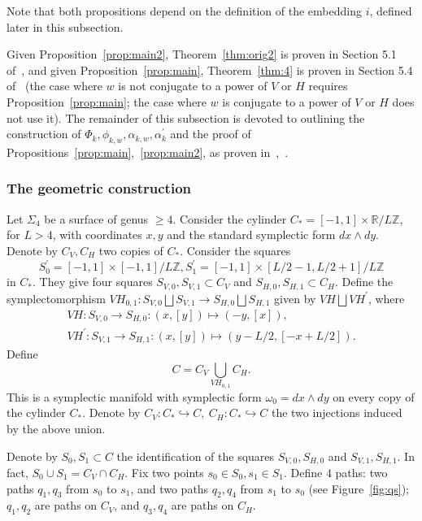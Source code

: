\documentclass[11pt]{article}
\newenvironment{myequation}
    {
        \begin{equation*}
        \begin{gathered}
    }
    { 
        \end{gathered} 
        \end{equation*}
    }
\newcommand{\Z}{\mathbb{Z}}
\begin{document}
            Note that both propositions depend on the definition of the embedding $i$, defined later in this subsection.
            
            Given Proposition~\ref{prop:main2}, Theorem~\ref{thm:orig2} is proven in Section 5.1 of~\cite{PS14}, and given Proposition~\ref{prop:main}, Theorem~\ref{thm:4} is proven in Section 5.4 of~\cite{10} (the case where $w$ is not conjugate to a power of $V$ or $H$ requires Proposition~\ref{prop:main}; the case where $w$ is conjugate to a power of $V$ or $H$ does not use it). The remainder of this subsection is devoted to outlining the construction of $\Phi_k, \phi_{k,w}, \alpha_{k,w}, \alpha_k^\prime$ and the proof of Propositions~\ref{prop:main},~\ref{prop:main2}, as proven in~\cite{PS14},~\cite{10}. \\
        
        \subsubsection{The geometric construction}\label{sec:geometric}
            Let $\Sigma_4$ be a surface of genus $\geq 4$. Consider the cylinder $C_*=[-1,1]\times\mathbb{R}/L\mathbb{Z}$, for $L > 4$, with coordinates $x,y$ and the standard symplectic form $dx\wedge dy$. Denote by $C_V,C_H$ two copies of $C_*$. Consider the squares
            \[
                S_0^\prime = [-1,1]\times[-1,1]/L\Z, S_1^\prime = [-1,1]\times[L/2-1,L/2+1]/L\Z
            \]
            in $C_*$. They give four squares $S_{V,0},S_{V,1}\subset C_V$ and $S_{H,0},S_{H,1}\subset C_H$. Define the symplectomorphism $VH_{0,1}:S_{V,0}\bigsqcup S_{V,1} \to S_{H,0} \bigsqcup S_{H,1}$ given by $VH\bigsqcup VH^\prime$, where
            \begin{myequation}
                VH:S_{V,0}\to S_{H,0} : (x,[y]) \mapsto (-y,[x]) ,\\
                VH^\prime : S_{V,1}\to S_{H,1} : (x,[y]) \mapsto (y-L/2, [-x+L/2]) .
            \end{myequation}
            Define
            \[
                C = C_V \bigcup_{VH_{0,1}} C_H .
            \]
            This is a symplectic manifold with symplectic form $\omega_0 = dx \wedge dy$ on every copy of the cylinder $C_*$. Denote by $C_V: C_* \hookrightarrow C, \ C_H: C_* \hookrightarrow C$ the two injections induced by the above union.
            
            Denote by $S_0,S_1 \subset C$ the identification of the squares $S_{V,0},S_{H,0}$ and $S_{V,1},S_{H,1}$. In fact, $S_0 \cup S_1 = C_V \cap C_H$. Fix two points $s_0 \in S_0, s_1 \in S_1$. Define 4 paths: two paths $q_1,q_3$ from $s_0$ to $s_1$, and two paths $q_2,q_4$ from $s_1$ to $s_0$ (see Figure~\ref{fig:qs}); $q_1, q_2$ are paths on $C_V$, and $q_3,q_4$ are paths on $C_H$.
    
\end{document}
